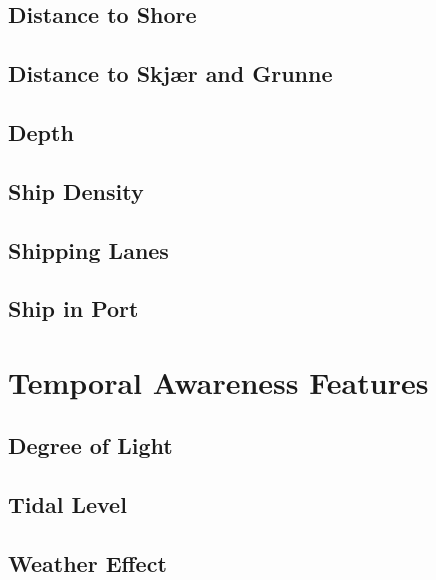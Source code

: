 \subsection{Distance to Shore}

\subsection{Distance to Skjær and Grunne}
\subsection{Depth}
\subsection{Ship Density}
\subsection{Shipping Lanes}
\subsection{Ship in Port}

\section{Temporal Awareness Features}

\subsection{Degree of Light}
\subsection{Tidal Level}
\subsection{Weather Effect}
\begin{info}{}
\end{info}


